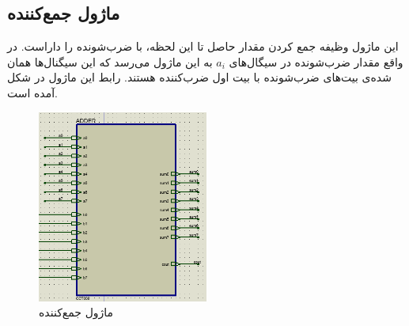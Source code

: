 \documentclass[12pt,onecolumn,a4paper,fleqn]{article}
\begin{document}
	\subsection{ماژول جمع‌کننده}
	این ماژول وظیفه جمع کردن مقدار حاصل تا این لحظه، با ضرب‌شونده را داراست. در واقع مقدار ضرب‌شونده در سیگال‌های $a_i$ به این ماژول می‌رسد که این سیگنال‌ها همان   شده‌ی بیت‌های ضرب‌شونده با بیت اول ضرب‌کننده هستند. رابط این ماژول در شکل آمده است.
	\begin{figure}[H]
		\centering
		\includegraphics[width=0.5\textwidth]{source/adder.png}
		\caption{ماژول جمع‌کننده}
		\label{fig:adder}
	\end{figure}
\end{document}
